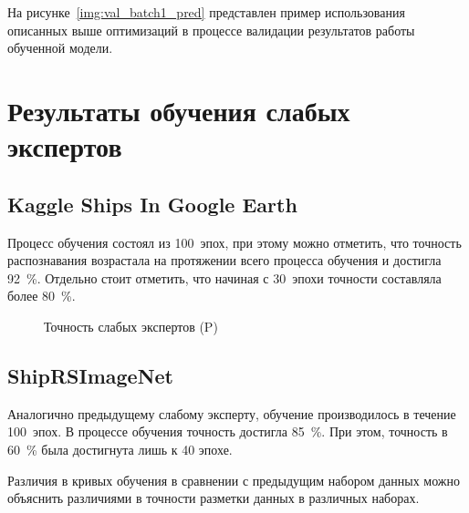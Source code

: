 На рисунке~\ref{img:val_batch1_pred} представлен пример использования описанных выше оптимизаций в процессе валидации результатов работы обученной модели.


\section{Результаты обучения слабых экспертов}

\subsection*{Kaggle Ships In Google Earth}

Процесс обучения состоял из 100~эпох, при этому можно отметить, что точность распознавания возрастала на протяжении всего процесса обучения и достигла 92~\%. Отдельно стоит отметить, что начиная с 30~эпохи точности составляла более 80~\%.


\begin{figure}[htp]
	\centering
	\captionsetup{justification=centering}
	\caption{Точность слабых экспертов (P)}
	\label{plt:precision}
\end{figure}

\subsection*{ShipRSImageNet}

Аналогично предыдущему слабому эксперту, обучение производилось в течение 100~эпох. В процессе обучения точность достигла 85~\%. При этом, точность в 60~\% была достигнута лишь к 40 эпохе.

Различия в кривых обучения в сравнении с предыдущим набором данных можно объяснить различиями в точности разметки данных в различных наборах.

